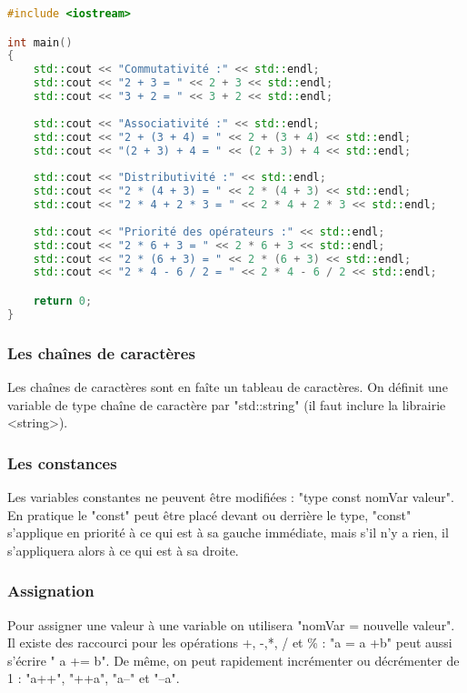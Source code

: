 \documentclass{article}
\begin{document}
\begin{lstlisting}[language = C++]
#include <iostream>

int main()
{
    std::cout << "Commutativité :" << std::endl;
    std::cout << "2 + 3 = " << 2 + 3 << std::endl;
    std::cout << "3 + 2 = " << 3 + 2 << std::endl;
 
    std::cout << "Associativité :" << std::endl;
    std::cout << "2 + (3 + 4) = " << 2 + (3 + 4) << std::endl;
    std::cout << "(2 + 3) + 4 = " << (2 + 3) + 4 << std::endl;
 
    std::cout << "Distributivité :" << std::endl;
    std::cout << "2 * (4 + 3) = " << 2 * (4 + 3) << std::endl;
    std::cout << "2 * 4 + 2 * 3 = " << 2 * 4 + 2 * 3 << std::endl;
    
    std::cout << "Priorité des opérateurs :" << std::endl;
    std::cout << "2 * 6 + 3 = " << 2 * 6 + 3 << std::endl;
    std::cout << "2 * (6 + 3) = " << 2 * (6 + 3) << std::endl;
    std::cout << "2 * 4 - 6 / 2 = " << 2 * 4 - 6 / 2 << std::endl;

    return 0;
}

\end{lstlisting}

\subsubsection{Les chaînes de caractères}
Les chaînes de caractères sont en faîte un tableau de caractères. On définit une variable de type chaîne de caractère par "std::string" (il faut inclure la librairie <string>).

\subsubsection{Les constances}
Les variables constantes ne peuvent être modifiées : "type const nomVar {valeur}". En pratique le "const" peut être placé devant ou derrière le type, "const" s'applique en priorité à ce qui est à sa gauche immédiate, mais s'il n'y a rien, il s'appliquera alors à ce qui est à sa droite.
\subsubsection{Assignation}
Pour assigner une valeur à une variable on utilisera "nomVar = nouvelle valeur". Il existe des raccourci pour les opérations +, -,*, / et \% : "a = a +b" peut aussi s'écrire " a += b". De même, on peut rapidement incrémenter ou décrémenter de 1 : "a++", "++a", "a--" et "--a".
\end{document}
